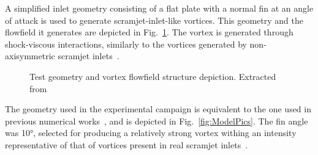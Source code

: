 \documentclass{AIAA}
\begin{document}
A simplified inlet geometry consisting of a flat plate with a normal fin at an angle of attack is used to generate scramjet-inlet-like vortices. This geometry and the flowfield it generates are depicted in Fig.~\ref{fig:Vortex_Sketches}. The vortex is generated through shock-viscous interactions, similarly to the vortices generated by non-axisymmetric scramjet inlets~\cite{Llobet_PlumeElongation,AFMCpaper2014}.
\begin{figure}[h]
\center
\caption{Test geometry and vortex flowfield structure depiction. Extracted from~\cite{JSASS_paper}}  
\label{fig:Vortex_Sketches}	
\end{figure}

The geometry used in the experimental campaign is equivalent to the one used in previous numerical works~\cite{SpacePlanes_paper2015,AFMCpaper2014,JSASS_paper,Llobet_PlumeElongation}, and is depicted in Fig.~\ref{fig:ModelPics}. The fin angle was \ang{10}, selected for producing a relatively strong vortex withing an intensity representative of that of vortices present in real scramjet inlets~\cite{AFMCpaper2014,SpacePlanes_paper2015}.
\end{document}
